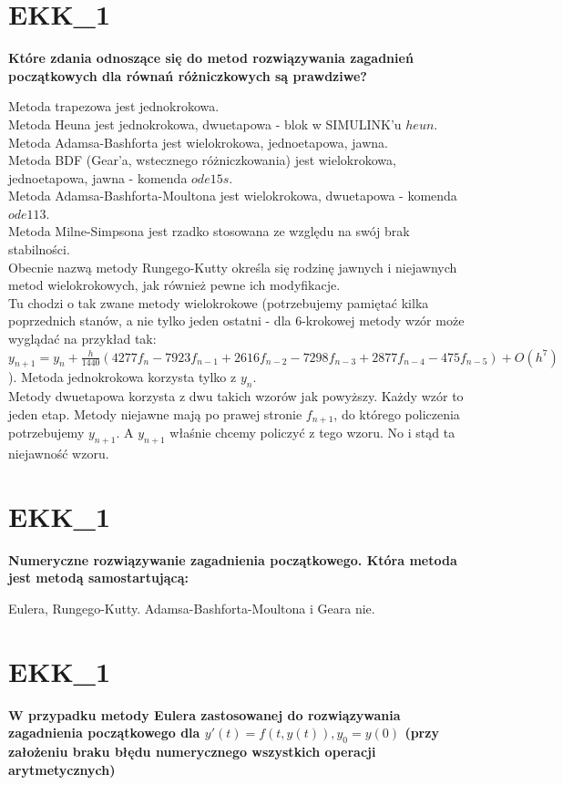 \section{EKK\_1}
\textbf{Które zdania odnoszące się do metod rozwiązywania zagadnień początkowych dla równań różniczkowych są prawdziwe?}

\vspace{0.4cm}
\noindent
Metoda trapezowa jest jednokrokowa.\\
Metoda Heuna jest jednokrokowa, dwuetapowa - blok w SIMULINK'u $heun$.\\
Metoda Adamsa-Bashforta jest wielokrokowa, jednoetapowa, jawna.\\
Metoda BDF (Gear'a, wstecznego różniczkowania) jest wielokrokowa, jednoetapowa, jawna - komenda $ode15s$.\\
Metoda Adamsa-Bashforta-Moultona jest wielokrokowa, dwuetapowa - komenda $ode113$.\\
Metoda Milne-Simpsona jest rzadko stosowana ze względu na swój brak stabilności.\\
Obecnie nazwą metody Rungego-Kutty określa się rodzinę jawnych i niejawnych metod wielokrokowych, jak również pewne ich modyfikacje. \\
Tu chodzi o tak zwane metody wielokrokowe (potrzebujemy pamiętać kilka poprzednich stanów, a nie tylko jeden ostatni - dla 6-krokowej metody wzór może wyglądać na przykład tak: $y_{n+1}=y_n+\frac{h}{1440}(4277f_n-7923f_{n-1}+2616f_{n-2}-7298f_{n-3}+2877f_{n-4}-475f_{n-5})+O(h^7)$).
Metoda jednokrokowa korzysta tylko z $y_n$.\\
Metody dwuetapowa korzysta z dwu takich wzorów jak powyższy. Każdy wzór to jeden etap.
Metody niejawne mają po prawej stronie $f_{n+1}$, do którego policzenia potrzebujemy $y_{n+1}$. A $y_{n+1}$ właśnie chcemy policzyć z tego wzoru. No i stąd ta niejawność wzoru.

\section{EKK\_1}
\textbf{Numeryczne rozwiązywanie zagadnienia początkowego. Która metoda jest metodą samostartującą:}

\vspace{0.4cm}
\noindent Eulera, Rungego-Kutty.
Adamsa-Bashforta-Moultona i Geara nie.

\section{EKK\_1}
\textbf{W przypadku metody Eulera zastosowanej do rozwiązywania zagadnienia początkowego dla $y'(t)=f(t,y(t)), y_0=y(0)$ (przy założeniu braku błędu numerycznego wszystkich operacji arytmetycznych)}

